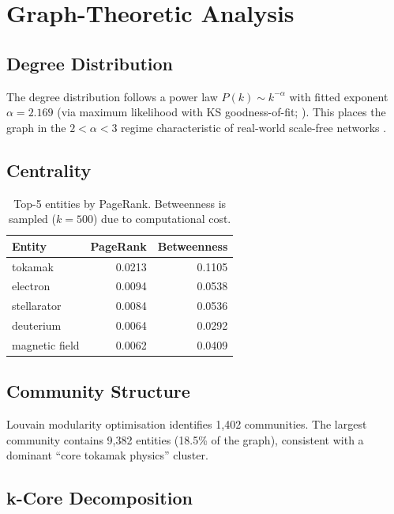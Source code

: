 \documentclass[11pt,a4paper]{article}
\begin{document}
\section{Graph-Theoretic Analysis}

\subsection{Degree Distribution}

The degree distribution follows a power law $P(k) \sim k^{-\alpha}$ with fitted exponent $\alpha = 2.169$ (via maximum likelihood with KS goodness-of-fit; \citealt{clauset2009}).  This places the graph in the $2 < \alpha < 3$ regime characteristic of real-world scale-free networks \citep{barabasi1999}.

\subsection{Centrality}

\begin{table}[h]
\centering
\begin{tabular}{lrr}
\toprule
Entity & PageRank & Betweenness \\
\midrule
tokamak & 0.0213 & 0.1105 \\
electron & 0.0094 & 0.0538 \\
stellarator & 0.0084 & 0.0536 \\
deuterium & 0.0064 & 0.0292 \\
magnetic field & 0.0062 & 0.0409 \\
\bottomrule
\end{tabular}
\caption{Top-5 entities by PageRank.  Betweenness is sampled ($k=500$) due to computational cost.}
\label{tab:centrality}
\end{table}

\subsection{Community Structure}

Louvain modularity optimisation \citep{blondel2008} identifies 1,402 communities.  The largest community contains 9,382 entities (18.5\% of the graph), consistent with a dominant ``core tokamak physics'' cluster.

\subsection{k-Core Decomposition}
\end{document}
